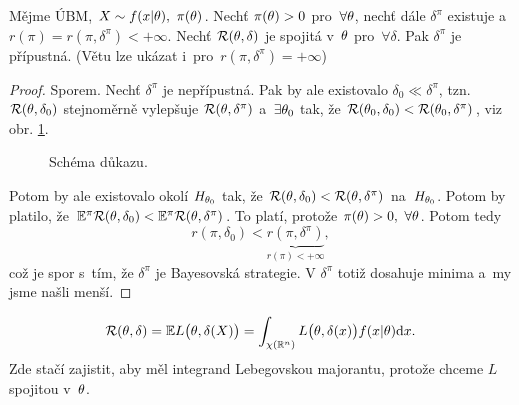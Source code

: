 \begin{theorem}
	Mějme ÚBM, $X\sim f(x|\theta),~\pi(\theta)$. Nechť $\pi(\theta)>0$ pro~$\forall\theta$, nechť dále $\delta^{\pi}$ existuje a~$r(\pi)=r(\pi,\delta^{\pi})<+\infty$. Nechť $\mathcal{R}(\theta,\delta)$ je spojitá v~$\theta$ pro~$\forall \delta$. Pak $\delta^\pi$ je přípustná. (Větu lze ukázat i~pro~$r(\pi,\delta^{\pi})=+\infty$)
	\begin{proof}
		Sporem. Nechť $\delta^\pi$ je nepřípustná. Pak by ale existovalo $\delta_0\ll\delta^\pi$, tzn. $\mathcal{R}(\theta,\delta_0)$ stejnoměrně vylepšuje $\mathcal{R}(\theta,\delta^\pi)$ a~$\exists\theta_0$ tak, že $\mathcal{R}(\theta_0,\delta_0)<\mathcal{R}(\theta_0,\delta^\pi)$, viz obr. \ref{fig:26}.
		\begin{figure}[h]
			\centering
			\caption{Schéma důkazu.}
			\label{fig:26}
		\end{figure}
		Potom by ale existovalo okolí $H_{\theta_0}$ tak, že $\mathcal{R}(\theta,\delta_0)<\mathcal{R}(\theta,\delta^\pi)$ na~$H_{\theta_0}$. Potom by platilo, že $\mathbb{E}^{\pi} \mathcal{R}(\theta,\delta_0)<\mathbb{E}^\pi \mathcal{R}(\theta,\delta^\pi)$. To platí, protože $\pi(\theta)>0,~\forall\theta$. Potom tedy 
		$$ r(\pi,\delta_0)<\underbrace{r(\pi,\delta^\pi)}_{r(\pi)<+\infty},$$ což je spor s~tím, že $\delta^{\pi}$ je Bayesovská strategie. V $\delta^{\pi}$ totiž dosahuje minima a~my jsme našli menší.
	\end{proof} 
\end{theorem}
\begin{remark} $$\mathcal{R}(\theta,\delta)=\mathbb{E} L\big(\theta,\delta(X)\big)=\int_{\chi(\mathbb{R}^n)}L\big(\theta,\delta(x)\big)f(x|\theta)\mathrm{d} x.$$ Zde stačí zajistit, aby měl integrand Lebegovskou majorantu, protože chceme $L$ spojitou v~$\theta$.

\end{remark}
